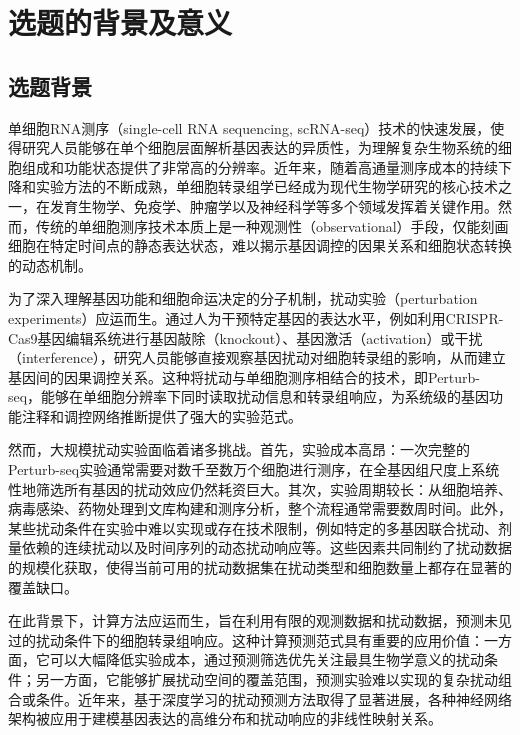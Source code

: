 \clearpage
\section{选题的背景及意义}

\subsection{选题背景}

单细胞RNA测序（single-cell RNA sequencing, scRNA-seq）技术的快速发展，使得研究人员能够在单个细胞层面解析基因表达的异质性，为理解复杂生物系统的细胞组成和功能状态提供了非常高的分辨率\cite{kolodziejczyk2015technology}。近年来，随着高通量测序成本的持续下降和实验方法的不断成熟，单细胞转录组学已经成为现代生物学研究的核心技术之一，在发育生物学、免疫学、肿瘤学以及神经科学等多个领域发挥着关键作用\cite{tanay2017scaling}。然而，传统的单细胞测序技术本质上是一种观测性（observational）手段，仅能刻画细胞在特定时间点的静态表达状态，难以揭示基因调控的因果关系和细胞状态转换的动态机制。

为了深入理解基因功能和细胞命运决定的分子机制，扰动实验（perturbation experiments）应运而生。通过人为干预特定基因的表达水平，例如利用CRISPR-Cas9基因编辑系统进行基因敲除（knockout）、基因激活（activation）或干扰（interference），研究人员能够直接观察基因扰动对细胞转录组的影响，从而建立基因间的因果调控关系\cite{dixit2016perturb}。这种将扰动与单细胞测序相结合的技术，即Perturb-seq，能够在单细胞分辨率下同时读取扰动信息和转录组响应，为系统级的基因功能注释和调控网络推断提供了强大的实验范式\cite{adamson2016multiplexed}。

然而，大规模扰动实验面临着诸多挑战。首先，实验成本高昂：一次完整的Perturb-seq实验通常需要对数千至数万个细胞进行测序，在全基因组尺度上系统性地筛选所有基因的扰动效应仍然耗资巨大\cite{replogle2022mapping}。其次，实验周期较长：从细胞培养、病毒感染、药物处理到文库构建和测序分析，整个流程通常需要数周时间。此外，某些扰动条件在实验中难以实现或存在技术限制，例如特定的多基因联合扰动、剂量依赖的连续扰动以及时间序列的动态扰动响应等\cite{norman2019exploring}。这些因素共同制约了扰动数据的规模化获取，使得当前可用的扰动数据集在扰动类型和细胞数量上都存在显著的覆盖缺口。

在此背景下，计算方法应运而生，旨在利用有限的观测数据和扰动数据，预测未见过的扰动条件下的细胞转录组响应\cite{rood2024toward, lotfollahi2023contextualization}。这种计算预测范式具有重要的应用价值：一方面，它可以大幅降低实验成本，通过预测筛选优先关注最具生物学意义的扰动条件；另一方面，它能够扩展扰动空间的覆盖范围，预测实验难以实现的复杂扰动组合或条件。近年来，基于深度学习的扰动预测方法取得了显著进展，各种神经网络架构被应用于建模基因表达的高维分布和扰动响应的非线性映射关系\cite{lotfollahi2019scgen, lotfollahi2022predicting}。

